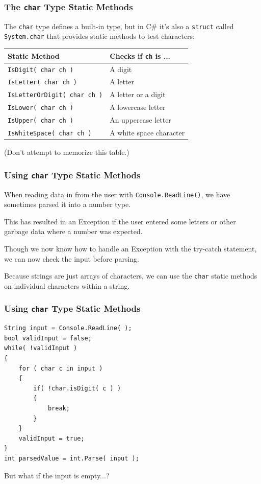 \begin{frame}
\frametitle{The \texttt{char} Type Static Methods}
The \texttt{char} type defines a built-in type, but in C\# it's also a \texttt{struct} called \texttt{System.char} that provides static methods to test characters:

\begin{center}
\begin{tabular}{l|l}
	\textbf{Static Method} & \textbf{Checks if }\texttt{ch}\textbf{ is ...} \\ \hline
	
\texttt{IsDigit( char ch )} &  A digit\\ \hline
\texttt{IsLetter( char ch )} &  A letter\\ \hline
\texttt{IsLetterOrDigit( char ch )} &  A letter or a digit\\ \hline
\texttt{IsLower( char ch )} &  A lowercase letter\\ \hline
\texttt{IsUpper( char ch )} &  An uppercase letter\\ \hline
\texttt{IsWhiteSpace( char ch )} &  A white space character\\ 
	
\end{tabular}
\end{center}

(Don't attempt to memorize this table.)
\end{frame}

\begin{frame}
\frametitle{Using \texttt{char} Type Static Methods}

When reading data in from the user with \texttt{Console.ReadLine()}, we have sometimes parsed it into a number type.

This has resulted in an Exception if the user entered some letters or other garbage data where a number was expected.

Though we now know how to handle an Exception with the try-catch statement, we can now check the input before parsing.

Because strings are just arrays of characters, we can use the \texttt{char} static methods on individual characters within a string.

\end{frame}

\begin{frame}[fragile]
\frametitle{Using \texttt{char} Type Static Methods}

\begin{verbatim}
String input = Console.ReadLine( );
bool validInput = false;
while( !validInput )
{
    for ( char c in input )
    {
        if( !char.isDigit( c ) )
        {
            break;
        }
    }
    validInput = true;
}
int parsedValue = int.Parse( input );
\end{verbatim}

But what if the input is empty...?

\end{frame}


